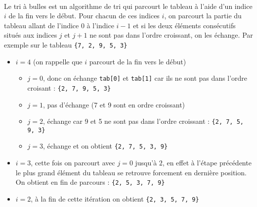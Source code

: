 \documentclass[11pt,a4paper]{article}
\begin{document}
\begin{Exercise}[title = {tri à bulles}] \\
Le tri à bulles est un algorithme de tri qui parcourt le tableau à l'aide d'un indice $i$ de la fin vers le début. Pour chacun de ces indices $i$, on parcourt la partie du tableau allant de l'indice 0 à l'indice $i-1$ et si les deux éléments consécutifs situés aux indices $j$ et $j+1$ ne sont pas dans l'ordre croissant, on les échange. Par exemple sur le tableau {\tt \{7, 2, 9, 5, 3\}}
\begin{itemize}
    \item[\textbullet] $i = 4$ (on rappelle que $i$ parcourt de la fin vers le début)
    \begin{itemize}
        \item $j=0$, donc on échange {\tt tab[0]} et {\tt tab[1]} car ils ne sont pas dans l'ordre croisant  : {\tt \{2, 7, 9, 5, 3\}}
        \item $j=1$, pas d'échange (7 et 9 sont en ordre croissant)
        \item $j=2$, échange car 9 et 5 ne sont pas dans l'ordre croissant : {\tt \{2, 7, 5, 9, 3\}}
        \item $j=3$, échange et on obtient {\tt \{2, 7, 5, 3, 9\}}
    \end{itemize}
    \item[\textbullet] $i=3$, cette fois on parcourt avec $j=0$ jusqu'à $2$, en effet à l'étape précédente le plus grand élément du tableau se retrouve forcement en dernière position. On obtient en fin de parcours : {\tt \{2, 5, 3, 7, 9\}}
    \item[\textbullet] $i=2$, à la fin de cette itération on obtient {\tt \{2, 3, 5, 7, 9\}}
\end{itemize}


\end{Exercise}
\end{document}
